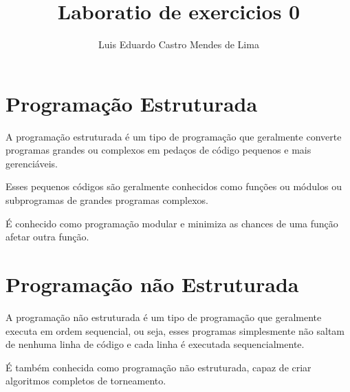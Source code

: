 \documentclass[12pt,a4paper]{abntex2}
\title{Laboratio de exercicios 0}
\author{Luis Eduardo Castro Mendes de Lima}
\begin{document}
\maketitle

\section{Programação Estruturada}

A programação estruturada é um tipo de programação que geralmente converte programas grandes ou
complexos em pedaços de código pequenos e mais gerenciáveis.

Esses pequenos códigos são geralmente conhecidos como funções ou módulos ou subprogramas de
grandes programas complexos.

É conhecido como programação modular e minimiza as chances de uma função afetar outra função.


\section{Programação não Estruturada}

 A programação não estruturada é um tipo de programação que geralmente executa em ordem
 sequencial, ou seja, esses programas simplesmente não saltam de nenhuma linha de código e
 cada linha é executada sequencialmente.

 É também conhecida como programação não estruturada, capaz de criar algoritmos completos de
 torneamento.\\
\end{document}
